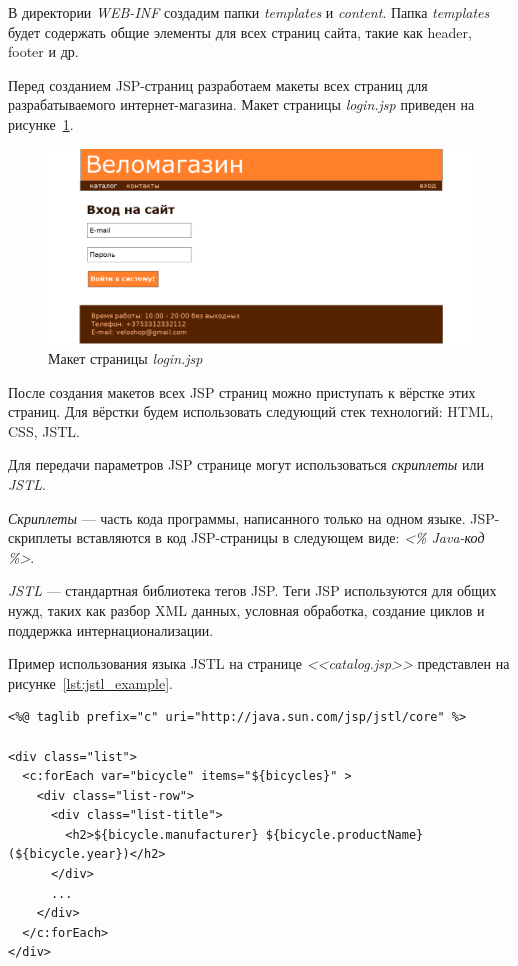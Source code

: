 В директории \textit{WEB-INF} создадим папки \textit{templates} и \textit{content}.
Папка \textit{templates} будет содержать общие элементы для всех страниц сайта,
такие как header, footer и др.

Перед созданием JSP-страниц разработаем макеты всех страниц для разрабатываемого
интернет-магазина. Макет страницы \textit{login.jsp} приведен
на рисунке~\ref{fig:wireframe_login}.

\begin{figure}[h]
  \centering
  \includegraphics[width=160mm]{pic/login_template.png}
  \caption{Макет страницы \textit{login.jsp}}
  \label{fig:wireframe_login}
\end{figure}

После создания макетов всех JSP страниц можно приступать к вёрстке этих страниц.
Для вёрстки будем использовать следующий стек технологий: HTML, CSS, JSTL.

Для передачи параметров JSP странице могут использоваться \textit{скриплеты}
или \textit{JSTL}.

\textit{Скриплеты} --- часть кода программы, написанного только на одном языке.
JSP-скриплеты вставляются в код JSP-страницы в следующем виде:
\textit{<\% Java-код \%>}.

\textit{JSTL} --- стандартная библиотека тегов JSP. Теги JSP используются
для общих нужд, таких как разбор XML данных, условная обработка, создание циклов и
поддержка интернационализации.

\pagebreak

Пример использования языка JSTL на странице \textit{<<catalog.jsp>>}
представлен на рисунке~\ref{lst:jstl_example}.

\begin{lstlisting}[caption=Пример использования JSTL на странице \textit{catalog.jsp}, label=lst:jstl_example]
<%@ taglib prefix="c" uri="http://java.sun.com/jsp/jstl/core" %>

<div class="list">
  <c:forEach var="bicycle" items="${bicycles}" >
    <div class="list-row">
      <div class="list-title">
        <h2>${bicycle.manufacturer} ${bicycle.productName} (${bicycle.year})</h2>
      </div>
      ...
    </div>
  </c:forEach>
</div>
\end{lstlisting}

